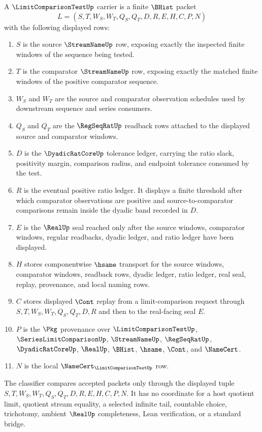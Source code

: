\begin{definition}\label{def:limit-comparison-test-carrier}
A $\LimitComparisonTestUp$ carrier is a finite $\BHist$ packet
$$
L=(S,T,W_S,W_T,Q_S,Q_T,D,R,E,H,C,P,N)
$$
with the following displayed rows:
\begin{enumerate}
\item $S$ is the source $\StreamNameUp$ row, exposing exactly the inspected finite windows of the sequence being tested.
\item $T$ is the comparator $\StreamNameUp$ row, exposing exactly the matched finite windows of the positive comparator sequence.
\item $W_S$ and $W_T$ are the source and comparator observation schedules used by downstream sequence and series consumers.
\item $Q_S$ and $Q_T$ are the $\RegSeqRatUp$ readback rows attached to the displayed source and comparator windows.
\item $D$ is the $\DyadicRatCoreUp$ tolerance ledger, carrying the ratio slack, positivity margin, comparison radius, and endpoint tolerance consumed by the test.
\item $R$ is the eventual positive ratio ledger. It displays a finite threshold after which comparator observations are positive and source-to-comparator comparisons remain inside the dyadic band recorded in $D$.
\item $E$ is the $\RealUp$ seal reached only after the source windows, comparator windows, regular readbacks, dyadic ledger, and ratio ledger have been displayed.
\item $H$ stores componentwise $\hsame$ transport for the source windows, comparator windows, readback rows, dyadic ledger, ratio ledger, real seal, replay, provenance, and local naming rows.
\item $C$ stores displayed $\Cont$ replay from a limit-comparison request through $S,T,W_S,W_T,Q_S,Q_T,D,R$ and then to the real-facing seal $E$.
\item $P$ is the $\Pkg$ provenance over $\LimitComparisonTestUp$, $\SeriesLimitComparisonUp$, $\StreamNameUp$, $\RegSeqRatUp$, $\DyadicRatCoreUp$, $\RealUp$, $\BHist$, $\hsame$, $\Cont$, and $\NameCert$.
\item $N$ is the local $\NameCert_{\LimitComparisonTestUp}$ row.
\end{enumerate}
The classifier compares accepted packets only through the displayed tuple $S,T,W_S,W_T,Q_S,Q_T,D,R,E,H,C,P,N$. It has no coordinate for a host quotient limit, quotient stream equality, a selected infinite tail, countable choice, trichotomy, ambient $\RealUp$ completeness, Lean verification, or a standard bridge.
\end{definition}

